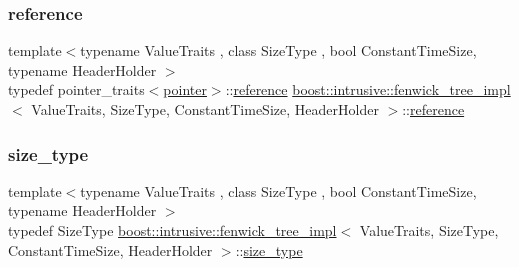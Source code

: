 \mbox{\label{classboost_1_1intrusive_1_1fenwick__tree__impl_a5fb6f0db4d5227a537e8a07eb1378e8e}} 
\subsubsection{\texorpdfstring{reference}{reference}}
{\footnotesize\ttfamily template$<$typename Value\+Traits , class Size\+Type , bool Constant\+Time\+Size, typename Header\+Holder $>$ \\
typedef pointer\+\_\+traits$<$\hyperlink{classboost_1_1intrusive_1_1fenwick__tree__impl_a5900d4b71e9c5715db38a848acbe270b}{pointer}$>$\+::\hyperlink{classboost_1_1intrusive_1_1fenwick__tree__impl_a5fb6f0db4d5227a537e8a07eb1378e8e}{reference} \hyperlink{classboost_1_1intrusive_1_1fenwick__tree__impl}{boost\+::intrusive\+::fenwick\+\_\+tree\+\_\+impl}$<$ Value\+Traits, Size\+Type, Constant\+Time\+Size, Header\+Holder $>$\+::\hyperlink{classboost_1_1intrusive_1_1fenwick__tree__impl_a5fb6f0db4d5227a537e8a07eb1378e8e}{reference}}

\mbox{\label{classboost_1_1intrusive_1_1fenwick__tree__impl_abf24adccfa8e65e8a382d4e25f906381}} 
\subsubsection{\texorpdfstring{size\+\_\+type}{size\_type}}
{\footnotesize\ttfamily template$<$typename Value\+Traits , class Size\+Type , bool Constant\+Time\+Size, typename Header\+Holder $>$ \\
typedef Size\+Type \hyperlink{classboost_1_1intrusive_1_1fenwick__tree__impl}{boost\+::intrusive\+::fenwick\+\_\+tree\+\_\+impl}$<$ Value\+Traits, Size\+Type, Constant\+Time\+Size, Header\+Holder $>$\+::\hyperlink{classboost_1_1intrusive_1_1fenwick__tree__impl_abf24adccfa8e65e8a382d4e25f906381}{size\+\_\+type}}

